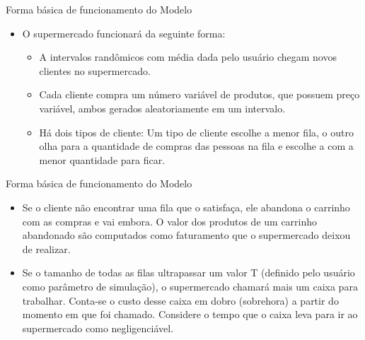 \documentclass[12pt,table,xcolor={dvipsnames}]{beamer}
\begin{document}
\begin{frame}[fragile]{Forma básica de funcionamento do Modelo}
\begin{itemize}
\item O supermercado funcionará da seguinte forma:
\begin{itemize}
\item A intervalos randômicos com média dada pelo usuário chegam novos clientes no supermercado.
\item Cada cliente compra um número variável de produtos, que possuem preço variável, ambos gerados aleatoriamente em um intervalo.
\item Há dois tipos de cliente: Um tipo de cliente escolhe a menor fila, o outro olha para a quantidade de compras das pessoas na fila e escolhe a com a menor quantidade para ficar.
\end{itemize}
\end{itemize}
\end{frame}

\begin{frame}[fragile]{Forma básica de funcionamento do Modelo}
\begin{itemize}
\item Se o cliente não encontrar uma fila que o satisfaça, ele abandona o carrinho com as compras e vai embora. O valor dos produtos de um carrinho abandonado são computados como faturamento que o supermercado deixou de realizar.
\item Se o tamanho de todas as filas ultrapassar um valor T (definido pelo usuário como parâmetro de simulação), o supermercado chamará mais um caixa para trabalhar. Conta-se o custo desse caixa em dobro (sobrehora) a partir do momento em que foi chamado. Considere o tempo que o caixa leva para ir ao supermercado como negligenciável. 
\end{itemize}
\end{frame}
\end{document}
